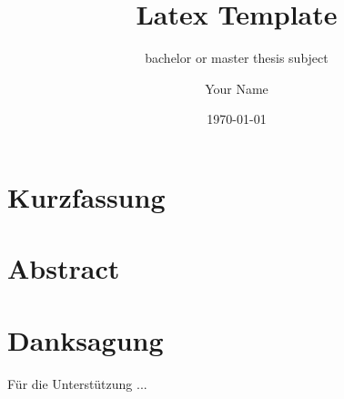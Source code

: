 \documentclass[
	12pt %
	,a4paper %
	,headings=normal %
	,toc=graduated %
]{scrreprt} %
\author{Your Name}
\title{Latex Template}
\subtitle{bachelor or master thesis subject}
\date{\today}
\begin{document}
\renewcommand{\thesection}{\Roman{section}} \renewcommand{\theHsection}{\Roman{section}}


\maketitle


\section*{Kurzfassung} %
\blindtext

\section*{Abstract}
\blindtext
{}

\newpage


\section*{Danksagung}

Für die Unterstützung ...\par


\tableofcontents

\pagebreak

\listoffigures

\pagebreak

\listoftables

\pagebreak

\pagebreak
\end{document}

